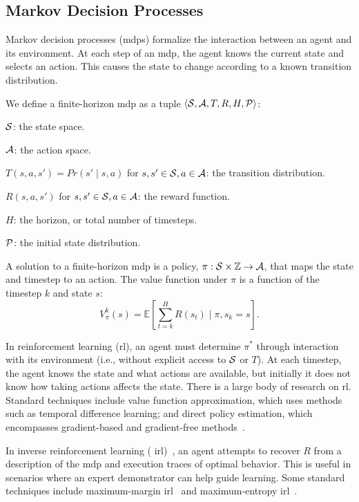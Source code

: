 \subsection{Markov Decision Processes}
Markov decision processes ({\sc mdp}s) formalize the interaction
between an agent and its environment. At each step of an {\sc mdp}, the
agent knows the current state and selects an action. This causes the
state to change according to a known transition distribution.
\begin{defn}
We define a finite-horizon {\sc mdp} as a tuple $\langle \mathcal{S}, \mathcal{A}, T,
R, H, \mathcal{P} \rangle$:
\begin{tightlist}
\item $\mathcal{S}$: the state space.
\item $\mathcal{A}$: the action space.
\item $T(s, a, s') = Pr(s' \mid s, a)$ for $s, s' \in \mathcal{S}, a \in \mathcal{A}$: the transition distribution.
\item $R(s, a, s')$ for $s, s' \in \mathcal{S}, a \in \mathcal{A}$: the reward function.
\item $H$: the horizon, or total number of timesteps.
\item $\mathcal{P}$: the initial state distribution.
\end{tightlist}
\end{defn}
A solution to a finite-horizon {\sc mdp} is a policy, $\pi: \mathcal{S} \times \mathbb{Z} \rightarrow \mathcal{A}$,
that maps the state and timestep to an action.  The
value function under $\pi$ is a function of the timestep $k$ and state
$s$:
$$V_{\pi}^{k}(s) = \mathbb{E}\left[\sum_{t=k}^{H}R(s_{t}) \mid \pi, s_{k} = s\right].$$

In reinforcement learning ({\sc rl}), an agent must determine
$\pi^{*}$ through interaction with its environment (i.e., without
explicit access to $\mathcal{S}$ or $T$). At each timestep, the agent knows
the state and what actions are available, but initially it does not know
how taking actions affects the state. There is a large body of
research on {\sc rl}. Standard techniques include value function
approximation, which uses methods such as temporal difference
learning; and direct policy estimation, which encompasses
gradient-based and gradient-free methods~\cite{suttonbarto}.

In inverse reinforcement learning ({\sc
  irl})~\cite{ng2000algorithms}, an agent attempts to recover $R$ from
a description of the {\sc mdp} and execution traces of optimal
behavior. This is useful in scenarios where an expert demonstrator can
help guide learning.  Some standard techniques include maximum-margin
{\sc irl}~\cite{abbeel2004apprenticeship} and maximum-entropy {\sc
  irl}~\cite{maxentirl}.

